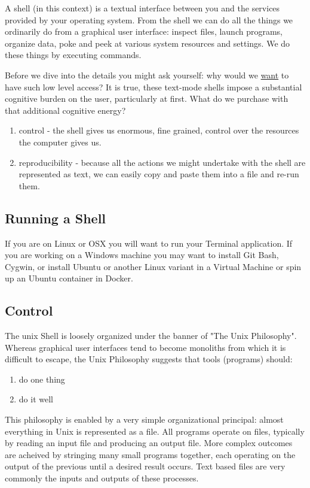 \documentclass[11pt]{article}
\begin{document}
A shell (in this context) is a textual interface between you and the
services provided by your operating system. From the shell we can do
all the things we ordinarily do from a graphical user interface:
inspect files, launch programs, organize data, poke and peek at
various system resources and settings. We do these things by executing
commands.

Before we dive into the details you might ask yourself: why would we
\uline{want} to have such low level access? It is true, these text-mode
shells impose a substantial cognitive burden on the user, particularly
at first. What do we purchase with that additional cognitive energy?

\begin{enumerate}
\item control - the shell gives us enormous, fine grained, control over
the resources the computer gives us.
\item reproducibility - because all the actions we might undertake with
the shell are represented as text, we can easily copy and paste
them into a file and re-run them.
\end{enumerate}

\subsection{Running a Shell}
\label{sec:orgc3f3d66}

If you are on Linux or OSX you will want to run your Terminal
application. If you are working on a Windows machine you may want to
install Git Bash, Cygwin, or install Ubuntu or another Linux variant
in a Virtual Machine or spin up an Ubuntu container in Docker.

\subsection{Control}
\label{sec:orgf059413}

The unix Shell is loosely organized under the banner of "The Unix
Philosophy". Whereas graphical user interfaces tend to become
monoliths from which it is difficult to escape, the Unix Philosophy
suggests that tools (programs) should:

\begin{enumerate}
\item do one thing
\item do it well
\end{enumerate}

This philosophy is enabled by a very simple organizational principal:
almost everything in Unix is represented as a file. All programs
operate on files, typically by reading an input file and producing an
output file. More complex outcomes are acheived by stringing many
small programs together, each operating on the output of the previous
until a desired result occurs. Text based files are very commonly the
inputs and outputs of these processes.
\end{document}
